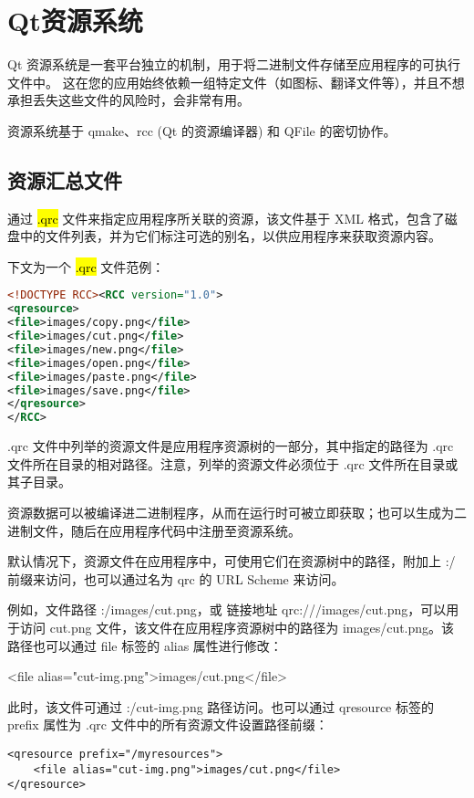\chapter{Qt资源系统}

Qt 资源系统是一套平台独立的机制，用于将二进制文件存储至应用程序的可执行文件中。
这在您的应用始终依赖一组特定文件（如图标、翻译文件等），并且不想承担丢失这些文件的风险时，会非常有用。

资源系统基于 qmake、rcc (Qt 的资源编译器) 和 QFile 的密切协作。

\section{资源汇总文件}

通过 \hl{.qrc} 文件来指定应用程序所关联的资源，该文件基于 XML 格式，包含了磁盘中的文件列表，并为它们标注可选的别名，以供应用程序来获取资源内容。

下文为一个 \hl{.qrc} 文件范例：

\begin{lstlisting}[language=XML]
<!DOCTYPE RCC><RCC version="1.0">
<qresource>
<file>images/copy.png</file>
<file>images/cut.png</file>
<file>images/new.png</file>
<file>images/open.png</file>
<file>images/paste.png</file>
<file>images/save.png</file>
</qresource>
</RCC>
\end{lstlisting}

.qrc 文件中列举的资源文件是应用程序资源树的一部分，其中指定的路径为 .qrc 文件所在目录的相对路径。注意，列举的资源文件必须位于 .qrc 文件所在目录或其子目录。

资源数据可以被编译进二进制程序，从而在运行时可被立即获取；也可以生成为二进制文件，随后在应用程序代码中注册至资源系统。

默认情况下，资源文件在应用程序中，可使用它们在资源树中的路径，附加上 :/ 前缀来访问，也可以通过名为 qrc 的 URL Scheme 来访问。

例如，文件路径 :/images/cut.png，或 链接地址 qrc:///images/cut.png，可以用于访问 cut.png 文件，该文件在应用程序资源树中的路径为 images/cut.png。该路径也可以通过 file 标签的 alias 属性进行修改：

\begin{cppcode}
<file alias="cut-img.png">images/cut.png</file>
\end{cppcode}

此时，该文件可通过 :/cut-img.png 路径访问。也可以通过 qresource 标签的 prefix 属性为 .qrc 文件中的所有资源文件设置路径前缀：

\begin{lstlisting}
<qresource prefix="/myresources">
    <file alias="cut-img.png">images/cut.png</file>
</qresource>
\end{lstlisting}

